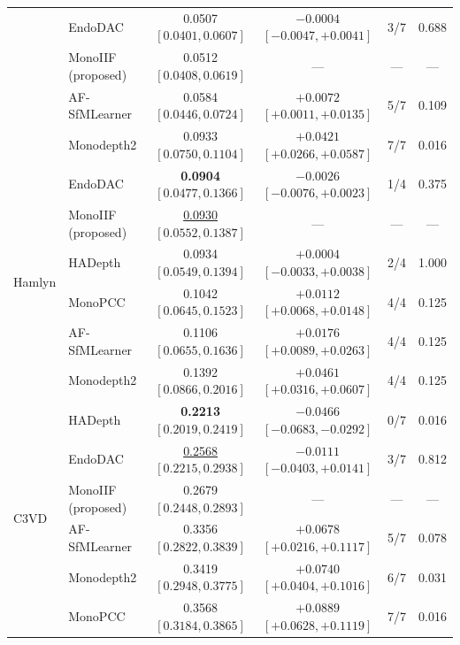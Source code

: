\documentclass[a4paper,fleqn]{cas-dc}
\begin{document}
{\begin{table}[t]
\begin{tabular}{llcccc}
 & EndoDAC            & 0.0507 $[0.0401, 0.0607]$             & $-0.0004$ $[-0.0047, +0.0041]$          & 3/7   & 0.688 \\
 & MonoIIF (proposed) & 0.0512 $[0.0408, 0.0619]$             & ---                                     & ---   & ---   \\
 & AF-SfMLearner      & 0.0584 $[0.0446, 0.0724]$             & $\mathbf{+0.0072}$ $[+0.0011, +0.0135]$ & 5/7   & 0.109 \\
 & Monodepth2         & 0.0933 $[0.0750, 0.1104]$             & $\mathbf{+0.0421}$ $[+0.0266, +0.0587]$ & 7/7   & 0.016 \\
\midrule
\multirow{6}{*}{Hamlyn}
 & EndoDAC            & \textbf{0.0904} $[0.0477, 0.1366]$    & $-0.0026$ $[-0.0076, +0.0023]$          & 1/4   & 0.375 \\
 & MonoIIF (proposed) & \underline{0.0930} $[0.0552, 0.1387]$ & ---                                     & ---   & ---   \\
 & HADepth            & 0.0934 $[0.0549, 0.1394]$             & $+0.0004$ $[-0.0033, +0.0038]$          & 2/4   & 1.000 \\
 & MonoPCC            & 0.1042 $[0.0645, 0.1523]$             & $\mathbf{+0.0112}$ $[+0.0068, +0.0148]$ & 4/4   & 0.125 \\
 & AF-SfMLearner      & 0.1106 $[0.0655, 0.1636]$             & $\mathbf{+0.0176}$ $[+0.0089, +0.0263]$ & 4/4   & 0.125 \\
 & Monodepth2         & 0.1392 $[0.0866, 0.2016]$             & $\mathbf{+0.0461}$ $[+0.0316, +0.0607]$ & 4/4   & 0.125 \\
\midrule
\multirow{6}{*}{C3VD}
 & HADepth            & \textbf{0.2213} $[0.2019, 0.2419]$    & $\mathbf{-0.0466}$ $[-0.0683, -0.0292]$ & 0/7   & 0.016 \\
 & EndoDAC            & \underline{0.2568} $[0.2215, 0.2938]$ & $-0.0111$ $[-0.0403, +0.0141]$          & 3/7   & 0.812 \\
 & MonoIIF (proposed) & 0.2679 $[0.2448, 0.2893]$             & ---                                     & ---   & ---   \\
 & AF-SfMLearner      & 0.3356 $[0.2822, 0.3839]$             & $\mathbf{+0.0678}$ $[+0.0216, +0.1117]$ & 5/7   & 0.078 \\
 & Monodepth2         & 0.3419 $[0.2948, 0.3775]$             & $\mathbf{+0.0740}$ $[+0.0404, +0.1016]$ & 6/7   & 0.031 \\
 & MonoPCC            & 0.3568 $[0.3184, 0.3865]$             & $\mathbf{+0.0889}$ $[+0.0628, +0.1119]$ & 7/7   & 0.016 \\
\bottomrule
\end{tabular}
\end{table}

}
\end{document}
